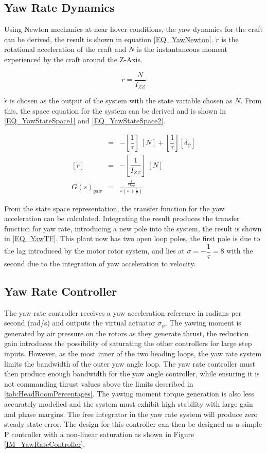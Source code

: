 	\subsection{Yaw Rate Dynamics}
	Using Newton mechanics at near hover conditions, the yaw dynamics for the craft can be derived, the result is shown in equation \eqref{EQ_YawNewton}. $\dot{r}$ is the rotational acceleration of the craft and $N$ is the instantaneous moment experienced by the craft around the Z-Axis.
	
	\begin{equation}
	\label{EQ_YawNewton}
	\dot{r} = \dfrac{N}{I_{ZZ}}
	\end{equation}
	
	$\dot{r}$ is chosen as the output of the system with the state variable chosen as $N$. From this, the space equation for the system can be derived and is shown in \eqref{EQ_YawStateSpace1} and \eqref{EQ_YawStateSpace2}. 
	
	\begin{eqnarray}
	[\dot{N}] &=& - [\dfrac{1}{\tau}] \ [N] + [\dfrac{1}{\tau}] [\delta_\psi]\label{EQ_YawStateSpace1}\\\label{EQ_HeaveStateSpace22}
	[\dot{r}] &=& - [\dfrac{1}{I_{ZZ}}] \ [N]\label{EQ_YawStateSpace2}\\
	G(s)_{yaw} &=& \frac{\frac{1}{\tau I_{ZZ}}}{s (s + \frac{1}{\tau})}\label{EQ_YawTF}
	\end{eqnarray}
	
	From the state space representation, the transfer function for the yaw acceleration can be calculated. Integrating the result produces the transfer function for yaw rate, introducing a new pole into the system, the result is shown in \eqref{EQ_YawTF}. This plant now has two open loop poles, the first pole is due to the lag introduced by the motor rotor system, and lies at $\sigma = -\dfrac{1}{\tau} = 8$ with the second due to the integration of yaw acceleration to velocity. 
	
	\subsection{Yaw Rate Controller}	
	The yaw rate controller receives a yaw acceleration reference in radians per second (rad/s) and outputs the virtual actuator $\sigma_{\psi}$. The yawing moment is generated by air pressure on the rotors as they generate thrust, the reduction gain introduces the possibility of saturating the other controllers for large step inputs. However, as the most inner of the two heading loops, the yaw rate system limits the bandwidth of the outer yaw angle loop. The yaw rate controller must then produce enough bandwidth for the yaw angle controller, while ensuring it is not commanding thrust values above the limits described in \ref{tab:HeadRoomPercentages}. The yawing moment torque generation is also less accurately modelled and the system must exhibit high stability with large gain and phase margins. The free integrator in the yaw rate system will produce zero steady state error. The design for this controller can then be designed as a simple P controller with a non-linear saturation as shown in Figure \ref{IM_YawRateController}.
	

